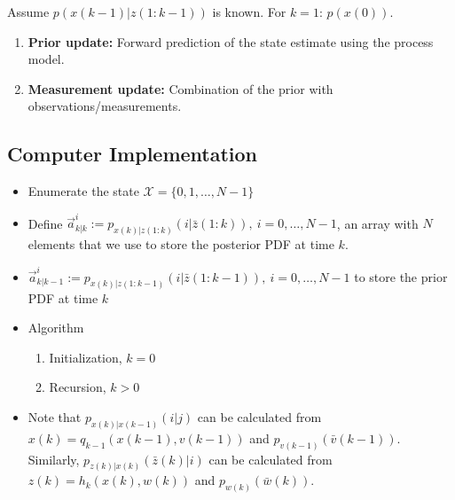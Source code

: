 \documentclass[10pt,a4paper]{scrartcl}
\begin{document}
\begin{multicols*}{2}
\begin{multicols*}{3}
Assume $p(x(k-1)|z(1:k-1))$ is known. For $k=1$: $p(x(0))$.

\begin{enumerate}
\item \textbf{Prior update:} Forward prediction of the state estimate using the process model.


\item \textbf{Measurement update:} Combination of the prior with observations/measurements.

\end{enumerate}

\subsection{Computer Implementation}

\begin{itemize}
\item Enumerate the state $\mathcal{X}=\{0,1,\ldots,N-1\}$
\item Define $\vec{a}_{k|k}^i:=p_{x(k)|z(1:k)}(i|\bar{z}(1:k)),\ i=0,\ldots,N-1$, an array with $N$ elements that we use to store the posterior PDF at time $k$.
\item $\vec{a}_{k|k-1}^i:=p_{x(k)|z(1:k-1)}(i|\bar{z}(1:k-1)),\ i=0,\ldots,N-1$ to store the prior PDF at time $k$
\item Algorithm
\begin{enumerate}
\item Initialization, $k=0$
\item Recursion, $k>0$
\end{enumerate}
\item Note that $p_{x(k)|x(k-1)}(i|j)$ can be calculated from $x(k)=q_{k-1}(x(k-1),v(k-1))$ and $p_{v(k-1)}(\bar{v}(k-1))$. Similarly, $p_{z(k)|x(k)}(\bar{z}(k)|i)$ can be calculated from $z(k)=h_k(x(k),w(k))$ and $p_{w(k)}(\bar{w}(k))$.
\end{itemize}


\end{multicols*}
\end{multicols*}
\end{document}
